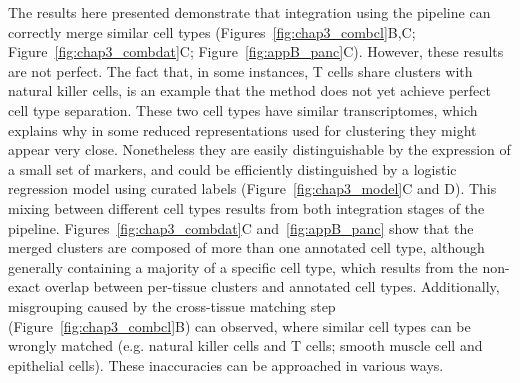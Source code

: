 The results here presented demonstrate that integration using the pipeline can correctly merge similar cell types (Figures~\ref{fig:chap3_combcl}B,C; Figure~\ref{fig:chap3_combdat}C; Figure~\ref{fig:appB_panc}C). However, these results are not perfect. The fact that, in some instances, T cells share clusters with natural killer cells, is an example that the method does not yet achieve perfect cell type separation. These two cell types have similar transcriptomes, which explains why in some reduced representations used for clustering they might appear very close. Nonetheless they are easily distinguishable by the expression of a small set of markers, and could be efficiently distinguished by a logistic regression model using curated labels (Figure~\ref{fig:chap3_model}C and D). This mixing between different cell types results from both integration stages of the pipeline. Figures~\ref{fig:chap3_combdat}C and~\ref{fig:appB_panc} show that the merged clusters are composed of more than one annotated cell type, although generally containing a majority of a specific cell type, which results from the non-exact overlap between per-tissue clusters and annotated cell types. Additionally, misgrouping caused by the cross-tissue matching step (Figure~\ref{fig:chap3_combcl}B) can observed, where similar cell types can be wrongly matched (e.g. natural killer cells and T cells; smooth muscle cell and epithelial cells). These inaccuracies can be approached in various ways. 

